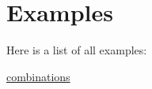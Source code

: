 \section{Examples}
Here is a list of all examples\-:\begin{DoxyCompactItemize}
\item 
\hyperlink{combinations-example}{combinations}
\end{DoxyCompactItemize}
